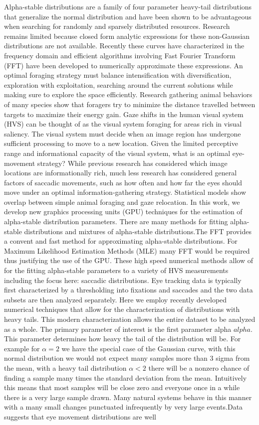 \documentclass[8pt,journal,compsoc]{IEEEtran}
\begin{document}
Alpha-stable distributions are a family of four parameter heavy-tail distributions that generalize the normal distribution and have been shown to be advantageous when searching for randomly and sparsely distributed resources. Research remains limited because closed form analytic expressions for these non-Gaussian distributions are not available. Recently these curves have characterized in the frequency domain and efficient algorithms involving Fast Fourier Transform (FFT) have been developed to numerically approximate these expressions.  An optimal foraging strategy must balance intensification with diversification, exploration with exploitation, searching around the current solutions while making sure to explore the space efficiently. Research gathering animal behaviors of many species show that foragers try to minimize the distance travelled between targets to maximize their energy gain. Gaze shifts in the human visual system (HVS) can be thought of as the visual system foraging for areas rich in visual saliency. The visual system must decide when an image region has undergone sufficient processing to move to a new location. Given the limited perceptive range and informational capacity of the visual system, what is an optimal eye-movement strategy? While previous research has considered which image locations are informationally rich, much less research has considered general factors of saccadic movements, such as how often and how far the eyes should move under an optimal information-gathering strategy. Statistical models show overlap between simple animal foraging and gaze relocation. In this work, we develop new graphics processing units (GPU) techniques for the estimation of alpha-stable distribution parameters. There are many methods for fitting alpha-stable distributions and mixtures of alpha-stable distributions.The FFT provides a convent and fast method for approximating alpha-stable distributions. For Maximum Likelihood Estimation Methods (MLE) many FFT would be required thus justifying the use of the GPU. These high speed numerical methods allow of for the fitting alpha-stable parameters to a variety of HVS measurements including the focus here: saccadic distributions. Eye tracking data is typically first characterized by a thresholding into fixations and saccades and the two data subsets are then analyzed separately. Here we employ recently developed numerical techniques that allow for the characterization of distributions with heavy tails. This modern characterization allows the entire dataset to be analyzed as a whole. The primary parameter of interest is the first parameter alpha $alpha$. This parameter determines how heavy the tail of the distribution will be. For example for $\alpha=2$ we have the special case of the Gaussian curve, with this normal distribution we would not expect many samples more than 3 sigma from the mean, with a heavy tail distribution $\alpha<2$ there will be a nonzero chance of finding a sample many times the standard deviation from the mean. Intuitively this means that most samples will be close zero and everyone once in a while there is a very large sample drawn. Many natural systems behave in this manner with a many small changes punctuated infrequently by very large events.Data suggests that eye movement distributions are well 
\end{document}
